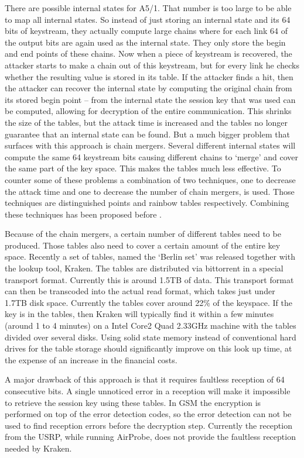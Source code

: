 \documentclass[a4paper,11pt]{llncs}
\begin{document}
There are  possible internal states for A5/1. That number is too large to be able to map all internal states. So instead of just storing an internal state and its 64 bits of keystream, they actually compute large chains where for each link 64 of the output bits are again used as the internal state. They only store the begin and end points of these chains. Now when a piece of keystream is recovered, the attacker starts to make a chain out of this keystream, but for every link he checks whether the resulting value is stored in its table. If the attacker finds a hit, then the attacker can recover the internal state by computing the original chain from its stored begin point -- from the internal state the session key that was used can be computed, allowing for decryption of the entire communication. This shrinks the size of the tables, but the attack time is increased and the tables no longer guarantee that an internal state can be found.  
But a much bigger problem that surfaces with this approach is chain mergers. Several different internal states will compute the same 64 keystream bits causing different chains to `merge' and cover the same part of the key space. This makes the tables much less effective. To counter some of these problems a combination of two techniques, one to decrease the attack time and one to decrease the number of chain mergers, is used. Those techniques are distinguished points and rainbow tables respectively. Combining these techniques has been proposed before \cite{Erguler:tmto,Hong:dp_rbt}.



Because of the chain mergers, a certain number of different tables need to be produced. Those tables also need to cover a certain amount of the entire key space. Recently a set of tables, named the `Berlin set' was released together with the lookup tool, Kraken. The tables are distributed via bittorrent in a special transport format. Currently this is around 1.5TB of data. This transport format can then be transcoded into the actual read format, which takes just under 1.7TB disk space. Currently the tables cover around 22\% of the keyspace. If the key is in the tables, then Kraken will typically find it within a few minutes (around 1 to 4 minutes) on a Intel Core2 Quad 2.33GHz machine with the tables divided over several disks. Using solid state memory instead of conventional hard drives for the table storage should significantly improve on this look up time, at the expense of an increase in the financial costs.

A major drawback of this approach is that it requires faultless reception of 64 consecutive bits. A single unnoticed error in a reception will make it impossible to retrieve the session key using these tables.
In GSM the encryption is performed on top of the error detection codes, so the error detection can not be used to find reception errors before the decryption step. Currently the reception from the USRP, while running AirProbe, does not provide the faultless reception needed by Kraken. 
\end{document}

